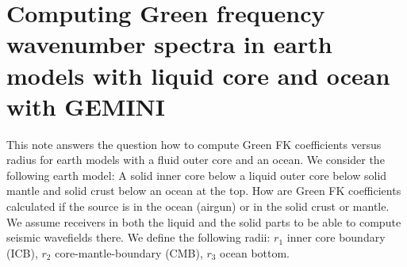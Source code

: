 \documentclass[12pt,a4paper]{article}
\begin{document}
\setlength{\parindent}{0cm}
\addtolength{\parskip}{0.1cm}
%
\section*{Computing Green frequency wavenumber spectra in earth models with liquid core and ocean with GEMINI}
%
This note answers the question how to compute Green FK coefficients versus radius for earth models with a fluid outer core and an ocean. We consider the following earth model: A solid inner core below a liquid outer core below solid mantle and solid crust below an ocean at the top. How are Green FK coefficients calculated if the source is in the ocean (airgun) or in the solid crust or mantle. We assume receivers in both the liquid and the solid parts to be able to compute seismic wavefields there. We define the following radii: $r_1$ inner core boundary (ICB), $r_2$ core-mantle-boundary (CMB), $r_3$ ocean bottom.
%
\end{document}
